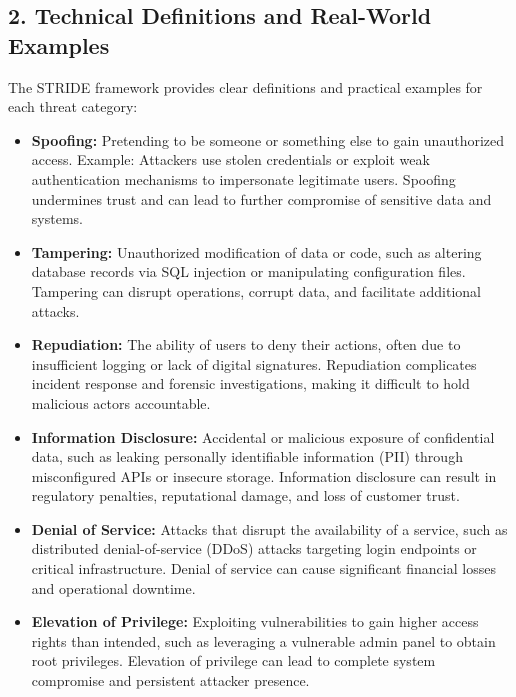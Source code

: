 \subsection*{2. Technical Definitions and Real-World Examples}
The STRIDE framework provides clear definitions and practical examples for each threat category:
\begin{itemize}
	\item \textbf{Spoofing:} Pretending to be someone or something else to gain unauthorized access. Example: Attackers use stolen credentials or exploit weak authentication mechanisms to impersonate legitimate users\cite{shostack2014}. Spoofing undermines trust and can lead to further compromise of sensitive data and systems.
	\item \textbf{Tampering:} Unauthorized modification of data or code, such as altering database records via SQL injection or manipulating configuration files\cite{owasp}. Tampering can disrupt operations, corrupt data, and facilitate additional attacks.
	\item \textbf{Repudiation:} The ability of users to deny their actions, often due to insufficient logging or lack of digital signatures\cite{nist800154}. Repudiation complicates incident response and forensic investigations, making it difficult to hold malicious actors accountable.
	\item \textbf{Information Disclosure:} Accidental or malicious exposure of confidential data, such as leaking personally identifiable information (PII) through misconfigured APIs or insecure storage\cite{uceda2015}. Information disclosure can result in regulatory penalties, reputational damage, and loss of customer trust.
	\item \textbf{Denial of Service:} Attacks that disrupt the availability of a service, such as distributed denial-of-service (DDoS) attacks targeting login endpoints or critical infrastructure\cite{owasp}. Denial of service can cause significant financial losses and operational downtime.
	\item \textbf{Elevation of Privilege:} Exploiting vulnerabilities to gain higher access rights than intended, such as leveraging a vulnerable admin panel to obtain root privileges\cite{shostack2014}. Elevation of privilege can lead to complete system compromise and persistent attacker presence.
\end{itemize}

